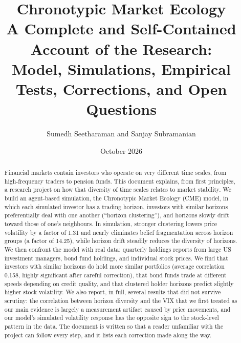 \documentclass[11pt]{article}
\title{\textbf{Chronotypic Market Ecology}\\[4pt]
\large A Complete and Self-Contained Account of the Research:\\
Model, Simulations, Empirical Tests, Corrections, and Open Questions}
\author{Sumedh Seetharaman and Sanjay Subramanian}
\date{October 2026}
\begin{document}
\maketitle

\begin{abstract}
\noindent
Financial markets contain investors who operate on very different time scales, from high-frequency traders to pension funds. This document explains, from first principles, a research project on how that diversity of time scales relates to market stability. We build an agent-based simulation, the Chronotypic Market Ecology (CME) model, in which each simulated investor has a trading horizon, investors with similar horizons preferentially deal with one another (``horizon clustering''), and horizons slowly drift toward those of one's neighbours. In simulation, stronger clustering lowers price volatility by a factor of 1.31 and nearly eliminates belief fragmentation across horizon groups (a factor of 14.25), while horizon drift steadily reduces the diversity of horizons. We then confront the model with real data: quarterly holdings reports from large US investment managers, bond fund holdings, and individual stock prices. We find that investors with similar horizons do hold more similar portfolios (average correlation 0.158, highly significant after careful correction), that bond funds trade at different speeds depending on credit quality, and that clustered holder horizons predict slightly higher stock volatility. We also report, in full, several results that did not survive scrutiny: the correlation between horizon diversity and the VIX that we first treated as our main evidence is largely a measurement artifact caused by price movements, and our model's simulated volatility response has the opposite sign to the stock-level pattern in the data. The document is written so that a reader unfamiliar with the project can follow every step, and it lists each correction made along the way.
\end{abstract}

\tableofcontents
\newpage













\end{document}
